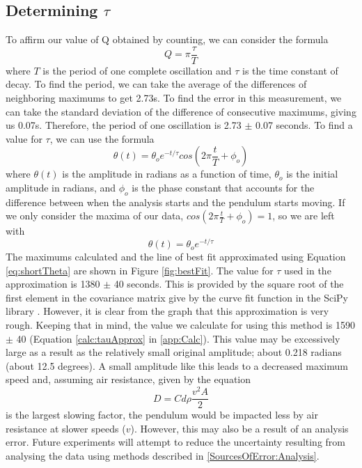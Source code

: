 \documentclass[11pt]{article}
\begin{document}
        \subsection{Determining $\tau$}
            To affirm our value of Q obtained by counting, we can consider the formula
            \begin{equation}
                Q = \pi \frac{\tau}{T}
                \label{eq:qTauRelation}
            \end{equation} 
            where $T$ is the period of one complete oscillation and $\tau$ is the time constant of decay. To find the period, we can take the average of the differences of neighboring maximums to get 2.73s. To find the error in this measurement, we can take the standard deviation of the difference of consecutive maximums, giving us 0.07s. Therefore, the period of one oscillation is 2.73 $\pm$ 0.07 seconds.
            To find a value for $\tau$, we can use the formula
            \begin{equation}
                \theta(t) = \theta_oe^{-t/\tau}cos(2\pi\frac{t}{T}+\phi_o)
                \label{eq:theta}
            \end{equation}
            where $\theta(t)$ is the amplitude in radians as a function of time, $\theta_o$ is the initial amplitude in radians, and $\phi_o$ is the phase constant that accounts for the difference between when the analysis starts and the pendulum starts moving. If we only consider the maxima of our data, $cos(2\pi\frac{t}{T}+\phi_o) = 1$, so we are left with 
            \begin{equation}
                \theta(t) = \theta_oe^{-t/\tau}
                \label{eq:shortTheta}
            \end{equation}
            The maximums calculated and the line of best fit approximated using Equation \ref{eq:shortTheta} are shown in Figure \ref{fig:bestFit}. The value for $\tau$ used in the approximation is 1380 $\pm$ 40 seconds. This is provided by the square root of the first element in the covariance matrix give by the curve fit function in the SciPy library \cite{2020SciPy-NMeth}. However, it is clear from the graph that this approximation is very rough. Keeping that in mind, the value we calculate for using this method is 1590 $\pm$ 40 (Equation \ref{calc:tauApprox} in  \ref{app:Calc}). This value may be excessively large as a result as the relatively small original amplitude; about 0.218 radians (about 12.5 degrees). A small amplitude like this leads to a decreased maximum speed and, assuming air resistance, given by the equation
            \begin{equation}
                D = Cd\rho\frac{v^2A}{2}
            \end{equation} is the largest slowing factor, the pendulum would be impacted less by air resistance at slower speeds ($v$). However, this may also be a result of an analysis error. Future experiments will attempt to reduce the uncertainty resulting from analysing the data using methods described in \ref{SourcesOfError:Analysis}.
\end{document}
